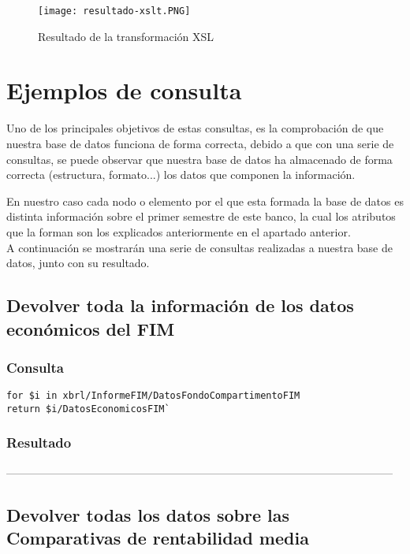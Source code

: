 \documentclass[11pt]{diazessay} %
\begin{document}
\begin{figure}[h!]
	\texttt{[image: resultado-xslt.PNG]}
	\caption{Resultado de la transformación XSL}
	\label{fig:xslt_result}
\end{figure}


\newpage
\section*{Ejemplos de consulta}
Uno de los principales objetivos de estas consultas, es la comprobación de que nuestra base de datos funciona de forma correcta, debido a que con una serie de consultas, se puede observar que nuestra base de datos ha almacenado de forma correcta (estructura, formato...) los datos que componen la información. 

En nuestro caso cada nodo o elemento por el que esta formada la base de datos es distinta información sobre el primer semestre de este banco, la cual los atributos que la forman son los explicados anteriormente en el apartado anterior.\\

A continuación se mostrarán una serie de consultas realizadas a nuestra base de datos, junto con su resultado.

\subsection*{Devolver toda la información de los datos económicos del FIM}
\subsubsection*{Consulta}
	\lstset{language=C}
\begin{lstlisting}
for $i in xbrl/InformeFIM/DatosFondoCompartimentoFIM
return $i/DatosEconomicosFIM`
\end{lstlisting}
	
\subsubsection*{Resultado}
 
---------------------------------------------------------------------------------------------------------\\


\subsection*{Devolver todas los datos sobre las Comparativas de rentabilidad media}
\end{document}
